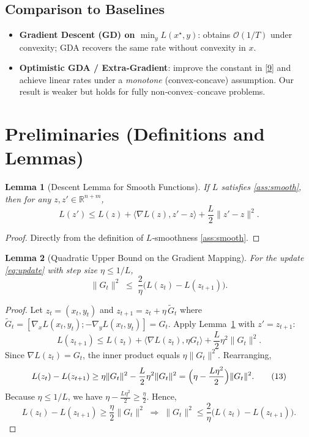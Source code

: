 \documentclass[11pt]{article}
\newtheorem{lemma}{Lemma}[section]
\begin{document}
\subsection{Comparison to Baselines}
\begin{itemize}
\item \textbf{Gradient Descent (GD) on $\min_y L(x^{\star},y)$}: obtains $\mathcal{O}(1/T)$ under convexity; GDA recovers the same rate without convexity in $x$.
\item \textbf{Optimistic GDA / Extra‑Gradient}: improve the constant in \eqref{9} and achieve linear rates under a \emph{monotone} (convex‑concave) assumption. Our result is weaker but holds for fully non‑convex–concave problems.
\end{itemize}

\section{Preliminaries (Definitions and Lemmas)}
\begin{lemma}[Descent Lemma for Smooth Functions]\label{lem:descent}
If $L$ satisfies \eqref{ass:smooth}, then for any $z,z'\in\mathbb{R}^{n+m}$,
\[
L(z')\le L(z)+\langle \nabla L(z),z'-z\rangle+\frac{L}{2}\|z'-z\|^{2}.
\tag{10}
\]
\end{lemma}
\begin{proof}
Directly from the definition of $L$‑smoothness \eqref{ass:smooth}. \hfill\qedsymbol
\end{proof}

\begin{lemma}[Quadratic Upper Bound on the Gradient Mapping]\label{lem:quad}
For the update \eqref{eq:update} with step size $\eta\le 1/L$,
\[
\|G_{t}\|^{2}\;\le\;\frac{2}{\eta}\bigl(L(z_t)-L(z_{t+1})\bigr).
\tag{11}
\]
\end{lemma}
\begin{proof}
Let $z_t=(x_t,y_t)$ and $z_{t+1}=z_t+\eta\,\tilde G_t$ where $\tilde G_t=[\nabla_x L(x_t,y_t);-\nabla_y L(x_t,y_t)] = G_t$. Apply Lemma~\ref{lem:descent} with $z'=z_{t+1}$:
\[
L(z_{t+1})\le L(z_t)+\langle \nabla L(z_t),\eta G_t\rangle+\frac{L}{2}\eta^{2}\|G_t\|^{2}.
\tag{12}
\]
Since $\nabla L(z_t)=G_t$, the inner product equals $\eta\|G_t\|^{2}$. Rearranging,
\[
L(z_t)-L(z_{t+1})\ge \eta\|G_t\|^{2}-\frac{L}{2}\eta^{2}\|G_t\|^{2}
      =\Bigl(\eta-\frac{L\eta^{2}}{2}\Bigr)\|G_t\|^{2}.
\tag{13}
\]
Because $\eta\le 1/L$, we have $\eta-\frac{L\eta^{2}}{2}\ge \frac{\eta}{2}$. Hence,
\[
L(z_t)-L(z_{t+1})\ge \frac{\eta}{2}\|G_t\|^{2}
\;\Longrightarrow\;
\|G_t\|^{2}\le \frac{2}{\eta}\bigl(L(z_t)-L(z_{t+1})\bigr).
\tag{14}
\]
\hfill\qedsymbol
\end{proof}
\end{document}
